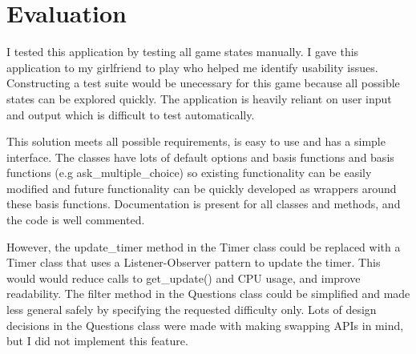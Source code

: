 \documentclass[12pt]{article}
\begin{document}
\section{Evaluation}

I tested this application by testing all game states manually. I gave this application to my girlfriend to play who helped me identify usability issues. Constructing a test suite would be unecessary for this game because all possible states can be explored quickly. The application is heavily reliant on user input and output which is difficult to test automatically. 

\vspace{\baselineskip}

This solution meets all possible requirements, is easy to use and has a simple interface. The classes have lots of default options and basis functions and basis functions (e.g ask\_multiple\_choice) so existing functionality can be easily modified and future functionality can be quickly developed as wrappers around these basis functions. Documentation is present for all classes and methods, and the code is well commented.

\vspace{\baselineskip}

However, the update\_timer method in the Timer class could be replaced with a Timer class that uses a Listener-Observer pattern to update the timer. This would would reduce calls to get\_update() and CPU usage, and improve readability. The filter method in the Questions class could be simplified and made less general safely by specifying the requested difficulty only. Lots of design decisions in the Questions class were made with making swapping APIs in mind, but I did not implement this feature.

\printbibliography
\end{document}
